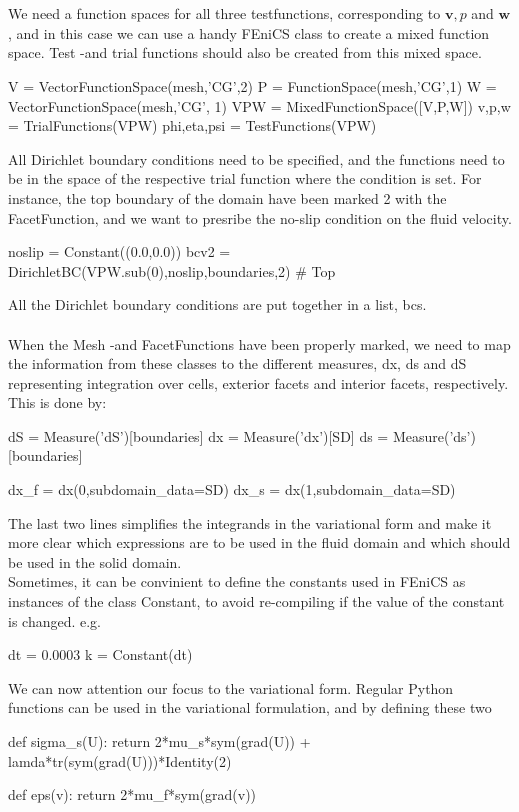 \\ \\	
We need a function spaces for all three testfunctions, corresponding to $\mathbf{v}, p$ and $\mathbf{w}$, and in this case we can use a handy FEniCS class to create a mixed function space. Test -and trial functions should also be created from this mixed space.
\begin{cverbatim}
V = VectorFunctionSpace(mesh,'CG',2)
P = FunctionSpace(mesh,'CG',1)
W = VectorFunctionSpace(mesh,'CG', 1)
VPW = MixedFunctionSpace([V,P,W])
v,p,w = TrialFunctions(VPW)
phi,eta,psi = TestFunctions(VPW)
\end{cverbatim}
All Dirichlet boundary conditions need to be specified, and the functions need to be in the space of the respective trial function where the condition is set. For instance, the top boundary of the domain have been marked 2 with the FacetFunction, and we want to presribe the no-slip condition on the fluid velocity.
\begin{cverbatim}
noslip = Constant((0.0,0.0))
bcv2 = DirichletBC(VPW.sub(0),noslip,boundaries,2) # Top
\end{cverbatim}
All the Dirichlet boundary conditions are put together in a list, bcs.\\ \\
When the Mesh -and FacetFunctions have been properly marked, we need to map the information from these classes to the different measures, dx, ds and dS representing integration over cells, exterior facets and interior facets, respectively. This is done by:
\begin{cverbatim}
dS = Measure('dS')[boundaries]
dx = Measure('dx')[SD]
ds = Measure('ds')[boundaries]

dx_f = dx(0,subdomain_data=SD)
dx_s = dx(1,subdomain_data=SD)
\end{cverbatim}
The last two lines simplifies the integrands in the variational form and make it more clear which expressions are to be used in the fluid domain and which should be used in the solid domain.
\\
Sometimes, it can be convinient to define the constants used in FEniCS as instances of the class Constant, to avoid re-compiling if the value of the constant is changed. e.g.
\begin{cverbatim}
dt = 0.0003
k = Constant(dt)
\end{cverbatim}
We can now attention our focus to the variational form. Regular Python functions can be used in the variational formulation, and by defining these two
\begin{cverbatim}
def sigma_s(U):
	return 2*mu_s*sym(grad(U)) + lamda*tr(sym(grad(U)))*Identity(2)

def eps(v):
	return 2*mu_f*sym(grad(v))
\end{cverbatim}
